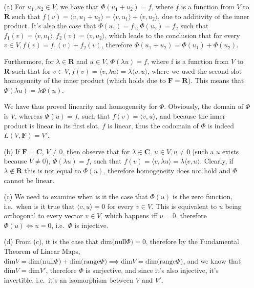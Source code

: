 \begin{solution}

    (a) 
    For $u_1, u_2 \in V$, we have that $\Phi(u_1 + u_2) = f$, where $f$ is a function from $V$ to $\mathbf{R}$ such that $f(v) = \langle v, u_1 + u_2 \rangle = \langle v, u_1 \rangle + \langle v, u_2 \rangle$, due to additivity of the inner product. It's also the case that $\Phi(u_1) = f_1, \Phi(u_2) = f_2$ such that $f_1(v) = \langle v, u_1 \rangle, f_2(v) = \langle v, u_2 \rangle$, which leads to the conclusion that for every $v \in V, f(v) = f_1(v) + f_2(v)$, therefore $\Phi(u_1 + u_2) = \Phi(u_1) + \Phi(u_2)$.
    
    Furthermore, for $\lambda \in \mathbf{R}$ and $u \in V$, $\Phi(\lambda u) = f$, where f is a function from $V$ to $\mathbf{R}$ such that for $v \in V, f(v) = \langle v, \lambda u \rangle = \lambda \langle v, u \rangle$, where we used the second-slot homogeneity of the inner product (which holds due to $\mathbf{F} = \mathbf{R}$). This means that $\Phi(\lambda u) = \lambda \Phi(u)$.

    We have thus proved linearity and homogeneity for $\Phi$. Obviously, the domain of $\Phi$ is $V$, whereas $\Phi(u) = f$, such that $f(v) = \langle v, u \rangle$, and because the inner product is linear in its first slot, $f$ is linear, thus the codomain of $\Phi$ is indeed $L(V, \mathbf{F}) = V'$.

    (b) If $\mathbf{F} = \mathbf{C}$, $V \neq 0$, then observe that for $\lambda \in \mathbf{C}$, $u \in V, u \neq 0$ (such a $u$ exists because $V \neq {0}$), $\Phi(\lambda u) = f$, such that $f(v) = \langle v, \lambda u \rangle = \overline{\lambda} \langle v, u \rangle$. Clearly, if $\lambda \notin \mathbf{R}$ this is not equal to $\Phi(u)$, therefore homogeneity does not hold and $\Phi$ cannot be linear.

    (c) We need to examine when is it the case that $\Phi(u)$ is the zero function, i.e.\ when is it true that $\langle v, u \rangle = 0$ for every $v \in V$. This is equivalent to $u$ being orthogonal to every vector $v \in V$, which happens iff $u = 0$, therefore $\Phi(u) \iff u = 0$, i.e.\ $\Phi$ is injective.

    (d) From (c), it is the case that $\text{dim(null} \Phi)= 0$, therefore by the Fundamental Theorem of Linear Maps, $\text{dim} V = \text{dim(null} \Phi) + \text{dim(range} \Phi) \implies \text{dim} V = \text{dim(range} \Phi)$, and we know that $\text{dim} V = \text{dim} V'$, therefore $\Phi$ is surjective, and since it's also injective, it's invertible, i.e.\ it's an isomorphism between $V$ and $V'$.
\end{solution}

